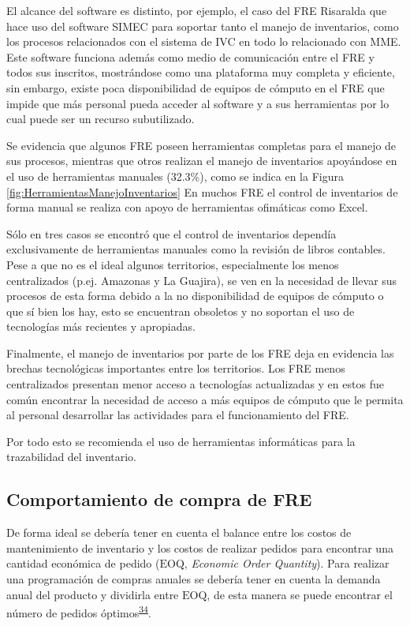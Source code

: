 \documentclass[
]{book}
\begin{document}
El alcance del software es distinto, por ejemplo, el caso del FRE Risaralda que hace uso del software SIMEC para soportar tanto el manejo de inventarios, como los procesos relacionados con el sistema de IVC en todo lo relacionado con MME. Este software funciona además como medio de comunicación entre el FRE y todos sus inscritos, mostrándose como una plataforma muy completa y eficiente, sin embargo, existe poca disponibilidad de equipos de cómputo en el FRE que impide que más personal pueda acceder al software y a sus herramientas por lo cual puede ser un recurso subutilizado.

Se evidencia que algunos FRE poseen herramientas completas para el manejo de sus procesos, mientras que otros realizan el manejo de inventarios apoyándose en el uso de herramientas manuales (32.3\%), como se indica en la Figura \ref{fig:HerramientasManejoInventarios} En muchos FRE el control de inventarios de forma manual se realiza con apoyo de herramientas ofimáticas como Excel.

Sólo en tres casos se encontró que el control de inventarios dependía exclusivamente de herramientas manuales como la revisión de libros contables. Pese a que no es el ideal algunos territorios, especialmente los menos centralizados (p.ej. Amazonas y La Guajira), se ven en la necesidad de llevar sus procesos de esta forma debido a la no disponibilidad de equipos de cómputo o que sí bien los hay, esto se encuentran obsoletos y no soportan el uso de tecnologías más recientes y apropiadas.

Finalmente, el manejo de inventarios por parte de los FRE deja en evidencia las brechas tecnológicas importantes entre los territorios. Los FRE menos centralizados presentan menor acceso a tecnologías actualizadas y en estos fue común encontrar la necesidad de acceso a más equipos de cómputo que le permita al personal desarrollar las actividades para el funcionamiento del FRE.

Por todo esto se recomienda el uso de herramientas informáticas para la trazabilidad del inventario.

\hypertarget{comportamiento-de-compra-de-fre}{%
\subsection{Comportamiento de compra de FRE}\label{comportamiento-de-compra-de-fre}}

De forma ideal se debería tener en cuenta el balance entre los costos de mantenimiento de inventario y los costos de realizar pedidos para encontrar una cantidad económica de pedido (\(\mathrm{EOQ}\), \emph{Economic Order Quantity}). Para realizar una programación de compras anuales se debería tener en cuenta la demanda anual del producto y dividirla entre \(\mathrm{EOQ}\), de esta manera se puede encontrar el número de pedidos óptimos\textsuperscript{\protect\hyperlink{ref-Silver2017}{34}}.
\end{document}
